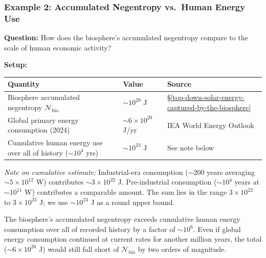 \documentclass[11pt]{article}
\theoremstyle{plain}
\theoremstyle{definition}
\theoremstyle{remark}
\newcounter{none}
\let\origsubsubsection\subsubsection
\renewcommand{\subsubsection}{\needspace{4\baselineskip}\origsubsubsection}
\begin{document}
\subsubsection{Example 2: Accumulated Negentropy vs.~Human Energy
Use}\label{example-2-accumulated-negentropy-vs.-human-energy-use}

\textbf{Question:} How does the biosphere's accumulated negentropy
compare to the scale of human economic activity?

\textbf{Setup:}

{\def\LTcaptype{none} %
\begin{longtable}[]{@{}
  >{\raggedright\arraybackslash}p{}
  >{\raggedright\arraybackslash}p{}
  >{\raggedright\arraybackslash}p{}@{}}
\toprule\noalign{}
\begin{minipage}[b]{\linewidth}\raggedright
Quantity
\end{minipage} & \begin{minipage}[b]{\linewidth}\raggedright
Value
\end{minipage} & \begin{minipage}[b]{\linewidth}\raggedright
Source
\end{minipage} \\
\midrule\noalign{}
\endhead
\bottomrule\noalign{}
\endlastfoot
Biosphere accumulated negentropy \(\mathcal{N}_{\text{bio}}\) &
\(\sim 10^{29}\) J &
§\ref{top-down-solar-energy-captured-by-the-biosphere} \\
Global primary energy consumption (2024) & \(\sim 6 \times 10^{20}\)
J/yr & IEA World Energy Outlook \\
Cumulative human energy use over all of history (\(\sim 10^4\) yrs) &
\(\sim 10^{23}\) J & See note below \\
\end{longtable}
}

\emph{Note on cumulative estimate:} Industrial-era consumption
($\sim$200 years averaging \(\sim 5 \times 10^{12}\) W) contributes
\(\sim 3 \times 10^{22}\) J. Pre-industrial consumption (\(\sim 10^4\)
years at \(\sim 10^{11}\) W) contributes a comparable amount. The sum
lies in the range \(3 \times 10^{22}\) to \(3 \times 10^{23}\) J; we use
\(\sim 10^{23}\) J as a round upper bound.

The biosphere's accumulated negentropy exceeds cumulative human energy
consumption over all of recorded history by a factor of \(\sim 10^6\).
Even if global energy consumption continued at current rates for another
million years, the total (\(\sim 6 \times 10^{26}\) J) would still fall
short of \(\mathcal{N}_{\text{bio}}\) by two orders of magnitude.
\end{document}
